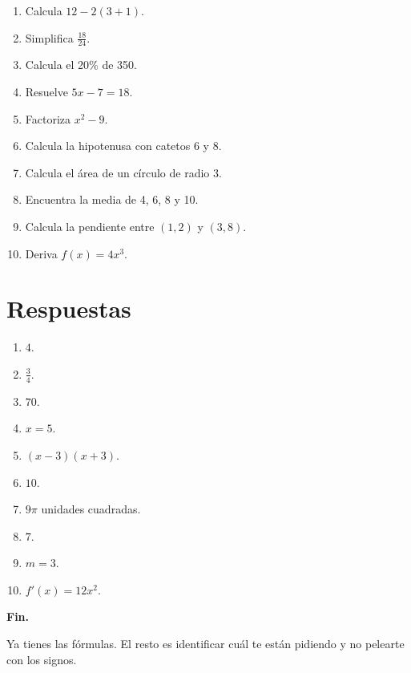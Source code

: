 \documentclass[10pt,oneside]{book}
\begin{document}
	\begin{enumerate}
		\item Calcula $12-2(3+1)$.
		\item Simplifica $\frac{18}{24}$.
		\item Calcula el 20\% de 350.
		\item Resuelve $5x-7=18$.
		\item Factoriza $x^2-9$.
		\item Calcula la hipotenusa con catetos 6 y 8.
		\item Calcula el área de un círculo de radio 3.
		\item Encuentra la media de 4, 6, 8 y 10.
		\item Calcula la pendiente entre $(1,2)$ y $(3,8)$.
		\item Deriva $f(x)=4x^3$.
	\end{enumerate}
	
	\section*{Respuestas}
	
	\begin{enumerate}
		\item $4$.
		\item $\frac34$.
		\item $70$.
		\item $x=5$.
		\item $(x-3)(x+3)$.
		\item $10$.
		\item $9\pi$ unidades cuadradas.
		\item $7$.
		\item $m=3$.
		\item $f'(x)=12x^2$.
	\end{enumerate}
	
	\vfill
	\begin{center}
		\textbf{Fin.}
		
		Ya tienes las fórmulas. El resto es identificar cuál
		te están pidiendo y no pelearte con los signos.
	\end{center}
	
\end{document}
